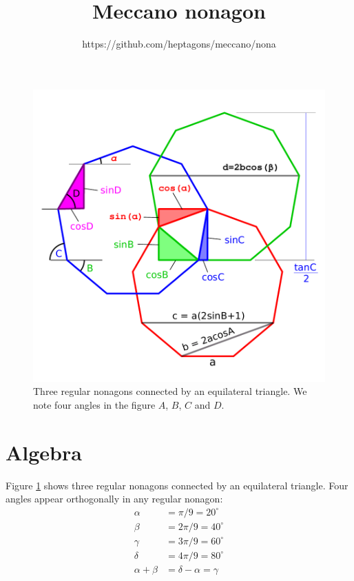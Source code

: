 \documentclass[11pt]{article}
\title{\textbf{Meccano nonagon}}
\author{https://github.com/heptagons/meccano/nona}
\date{}
\begin{document}
\maketitle

\begin{figure}[h]
\centering
\includegraphics[scale=0.7]{figs/3nonagons}
\caption{Three regular nonagons connected by an equilateral triangle.
We note four angles in the figure $A$, $B$, $C$ and $D$.}
\label{fig:nonagons}
\end{figure}





\section{Algebra}

Figure \ref{fig:nonagons} shows three regular nonagons connected by an equilateral 
triangle. Four angles appear orthogonally in any regular nonagon:
\begin{align}
\alpha &= \pi/9 = 20^{\circ} \\
\beta &= 2\pi/9 = 40^{\circ} \\
\gamma &= 3\pi/9 = 60^{\circ} \\
\delta &= 4\pi/9 = 80^{\circ} \\
\alpha + \beta &= \delta - \alpha = \gamma
\end{align}
\end{document}
